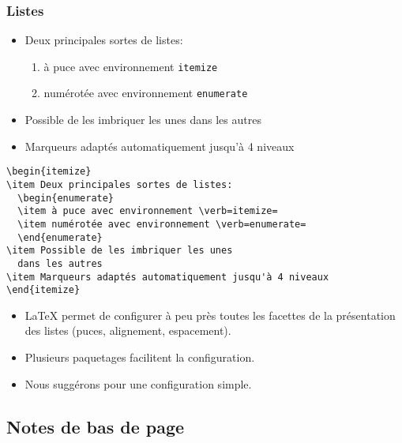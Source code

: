 \begin{frame}[fragile]
  \frametitle{Listes}
  \begin{itemize}
  \item Deux principales sortes de listes:
    \begin{enumerate}
    \item \alert{à puce} avec environnement \verb=itemize=
    \item \alert{numérotée} avec environnement \verb=enumerate=
    \end{enumerate}
  \item Possible de les imbriquer les unes dans les autres
  \item Marqueurs adaptés automatiquement jusqu'à 4 niveaux
  \end{itemize}
  \pause

\begin{lstlisting}
\begin{itemize}
\item Deux principales sortes de listes:
  \begin{enumerate}
  \item à puce avec environnement \verb=itemize=
  \item numérotée avec environnement \verb=enumerate=
  \end{enumerate}
\item Possible de les imbriquer les unes
  dans les autres
\item Marqueurs adaptés automatiquement jusqu'à 4 niveaux
\end{itemize}
\end{lstlisting}
\end{frame}

\begin{frame}[plain]
  \begin{conseil}
    \begin{itemize}
    \item {\LaTeX} permet de configurer à peu près toutes les facettes
      de la présentation des listes (puces, alignement, espacement).
    \item Plusieurs paquetages facilitent la configuration.
    \item Nous suggérons  pour une configuration simple.
    \end{itemize}
  \end{conseil}
\end{frame}

\subsection{Notes de bas de page}

